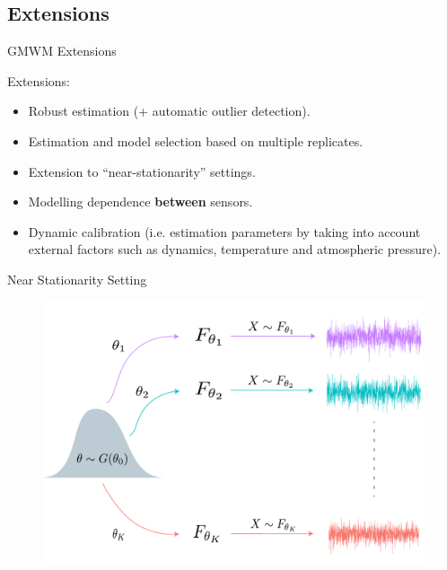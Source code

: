 \documentclass[envcountsect,usenames,dvipsnames]{beamer}
\theoremstyle{mystyle}
\begin{document}
\subsection{Extensions}

\begin{frame}{GMWM Extensions}   

\begin{block}{Extensions:}
\begin{itemize}
    \item Robust estimation (+ automatic outlier detection).
    \item Estimation and model selection based on multiple replicates.
    \item Extension to ``near-stationarity'' settings.
    \item Modelling dependence {\color{beamer@UIUCblue}\textbf{between}} sensors.
    \item Dynamic calibration (i.e. estimation parameters by taking into account external factors such as dynamics,  temperature and atmospheric pressure).
\end{itemize}
\end{block}

\end{frame}

\begin{frame}{Near Stationarity Setting}
    \begin{figure}
    \centering
    \includegraphics[scale = 0.43]{Images/nr_graph.pdf}
    \label{fig:nr}
\end{figure}
\end{frame}
\end{document}
